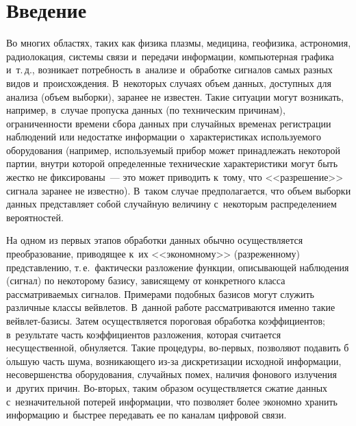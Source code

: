 
  



\thispagestyle{headings}

\begin{multicols}{2}

\label{st\stat}


\section{Введение}

Во многих областях, таких как физика плазмы, медицина, геофизика, 
астрономия, радиолокация, сис\-те\-мы связи и~передачи информации, компьютерная 
графика и~т.\,д., возникает по\-треб\-ность в~анализе и~обработке сигналов самых 
разных видов и~происхождения. В~некоторых случаях объем данных, доступных для 
анализа (объем выборки), заранее не известен. Такие ситуации могут возникать, 
например, в~случае пропуска данных (по техническим причинам), огра\-ни\-чен\-ности 
времени сбора данных при случайных временах регистрации наблюдений или недостатке 
информации о~характеристиках используемого оборудования (например, ис\-поль\-зу\-емый 
прибор может принадлежать некоторой партии, внут\-ри которой определенные 
технические характеристики могут быть жест\-ко не фиксированы~--- это может приводить 
к~тому, что <<разрешение>> сигнала заранее не известно). 
В~таком случае предполагается, что объем выборки данных пред\-став\-ля\-ет 
собой случайную величину с~некоторым распределением вероятностей.

На одном из первых этапов обработки данных обычно осуществляется 
преобразование, приводящее к~их <<экономному>> (разреженному) пред\-став\-ле\-нию, т.\,е.\
 фактически разложение функции, опи\-сы\-ва\-ющей наблюдения (сигнал) по некоторому\linebreak 
 базису, зависящему от конкретного класса рас\-смат\-ри\-ва\-емых сигналов. 
 Примерами подобных базисов могут служить различные классы вейв\-ле\-тов. 
 В~данной работе рас\-смат\-ри\-ва\-ют\-ся именно такие вейв\-лет-ба\-зи\-сы. 
 Затем осуществляется пороговая обработка коэффициентов; в~результате 
часть коэффициентов разложения, которая считается несущественной, 
 обнуляется. Такие процедуры, во-пер\-вых, позволяют подавить б$\acute{\mbox{о}}$льшую часть 
 шума, возникающего из-за дискретизации исходной информации, несовершенства 
 оборудования, случайных помех, наличия фонового излучения и~других причин. 
 Во-вто\-рых, таким образом осуществляется сжатие данных с~незначительной 
 потерей информации, что позволяет более экономно хранить информацию и~быст\-рее 
 передавать ее по каналам цифровой связи. 
 

\end{multicols}
